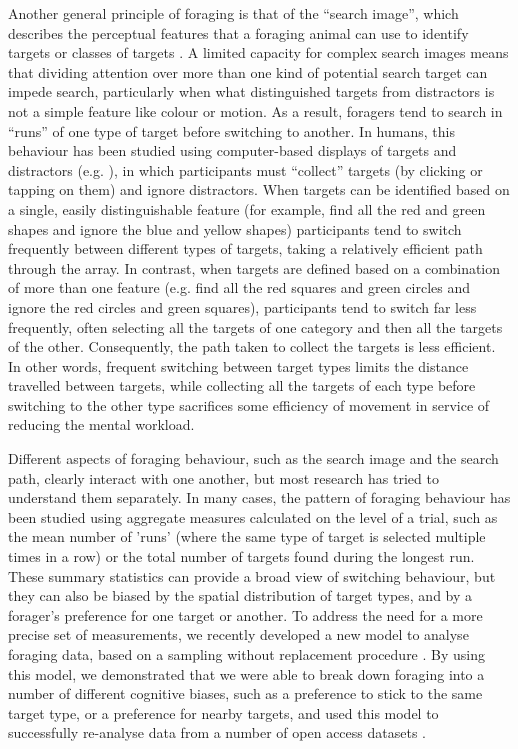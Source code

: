\documentclass[preprints, article,submit,pdftex,moreauthors]{Definitions/mdpi}
\begin{document}
Another general principle of foraging is that of the “search image”, which describes the perceptual features that a foraging animal can use to identify targets or classes of targets \cite{Dukas1993}. A limited capacity for complex search images means that dividing attention over more than one kind of potential search target can impede search, particularly when what distinguished targets from distractors is not a simple feature like colour or motion. As a result, foragers tend to search in “runs” of one type of target before switching to another. In humans, this behaviour has been studied using computer-based displays of targets and distractors (e.g. \citep{ kristjansson2014}), in which participants must “collect” targets (by clicking or tapping on them) and ignore distractors. When targets can be identified based on a single, easily distinguishable feature (for example, find all the red and green shapes and ignore the blue and yellow shapes) participants tend to switch frequently between different types of targets, taking a relatively efficient path through the array. In contrast, when targets are defined based on a combination of more than one feature (e.g. find all the red squares and green circles and ignore the red circles and green squares), participants tend to switch far less frequently, often selecting all the targets of one category and then all the targets of the other. Consequently, the path taken to collect the targets is less efficient. In other words, frequent switching between target types limits the distance travelled between targets, while collecting all the targets of each type before switching to the other type sacrifices some efficiency of movement in service of reducing the mental workload. 

Different aspects of foraging behaviour, such as the search image and the search path, clearly interact with one another, but most research has tried to understand them separately. In many cases, the pattern of foraging behaviour has been studied using aggregate measures calculated on the level of a trial, such as the mean number of 'runs' (where the same type of target is selected multiple times in a row) or the total number of targets found during the longest run. These summary statistics can provide a broad view of switching behaviour, but they can also be biased by the spatial distribution of target types, and by a forager's preference for one target or another. To address the need for a more precise set of measurements, we recently developed a new model to analyse foraging data, based on a sampling without replacement procedure \cite{clarke2022foraging}. By using this model, we demonstrated that we were able to break down foraging into a number of different cognitive biases, such as a preference to stick to the same target type, or a preference for nearby targets, and used this model to successfully re-analyse data from a number of open access datasets \cite{kristjansson2014, thornton2020, clarke2022, tagu_kristjansson_2021}. 
\end{document}
